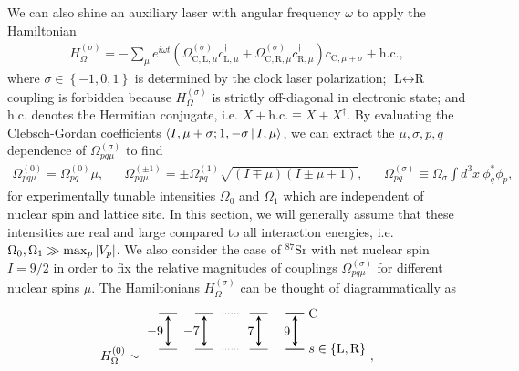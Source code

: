 \documentclass[aps,nofootinbib,notitlepage,11pt]{revtex4-1}
\renewcommand{\t}{\text} %
\newcommand{\p}[1]{\left(#1\right)} %
\renewcommand{\set}[1]{\left\{#1\right\}} %
\newcommand{\bk}{\Braket} %
\renewcommand{\L}{\text{L}}
\newcommand{\C}{\text{C}}
\newcommand{\R}{\text{R}}
\newcommand{\1}{\mathds{1}}
\begin{document}
We can also shine an auxiliary laser with angular frequency $\omega$
to apply the Hamiltonian
\begin{align}
  H_\Omega^{(\sigma)}
  = - \sum_\mu e^{i\omega t}
  \p{\Omega_{\C,\L,\mu}^{(\sigma)} c_{\L,\mu}^\dag
    + \Omega_{\C,\R,\mu}^{(\sigma)} c_{\R,\mu}^\dag} c_{\C,\mu+\sigma}
  + \t{h.c.},
\end{align}
where $\sigma\in\set{-1,0,1}$ is determined by the clock laser
polarization; $\L\leftrightarrow\R$ coupling is forbidden because
$H_\Omega^{(\sigma)}$ is strictly off-diagonal in electronic state;
and $\t{h.c.}$ denotes the Hermitian conjugate, i.e.
$X+\t{h.c.}\equiv X+X^\dag$.  By evaluating the Clebsch-Gordan
coefficients $\bk{I,\mu+\sigma;1,-\sigma|I,\mu}$, we can extract the
$\mu,\sigma,p,q$ dependence of $\Omega_{pq\mu}^{(\sigma)}$ to find
\begin{align}
  \Omega_{pq\mu}^{(0)} = \Omega_{pq}^{(0)} \mu,
  &&
  \Omega_{pq\mu}^{(\pm1)} = \pm \Omega_{pq}^{(1)}
  \sqrt{\p{I\mp\mu}\p{I\pm\mu+1}},
  &&
  \Omega_{pq}^{(\sigma)} \equiv \Omega_\sigma \int d^3x~ \phi_q^* \phi_p,
\end{align}
for experimentally tunable intensities $\Omega_0$ and $\Omega_1$ which
are independent of nuclear spin and lattice site.  In this section, we
will generally assume that these intensities are real and large
compared to all interaction energies,
i.e. $\Omega_0,\Omega_1\gg\max_p\abs{V_p}$.  We also consider the case
of ${}^{87}$Sr with net nuclear spin $I=9/2$ in order to fix the
relative magnitudes of couplings $\Omega_{pq\mu}^{(\sigma)}$ for
different nuclear spins $\mu$.  The Hamiltonians $H_\Omega^{(\sigma)}$
can be thought of diagrammatically as
\begin{align}
  H_\Omega^{(0)} \sim
  \begin{tikzpicture}[
    scale=0.5,
    trans/.style={thick,<->,shorten >=2pt,shorten <=2pt,>=stealth}
    ]
    \draw (0,0) -- (1,0);
    \draw (2,0) -- (3,0);
    \draw[dotted] (3.5,0) -- (4.5,0);
    \draw (5,0) -- (6,0);
    \draw (7,0) -- (8,0);
    \draw (7,0) -- (8,0) node[right] {$\C$};
    \draw (0,-2) -- (1,-2);
    \draw (2,-2) -- (3,-2);
    \draw[dotted] (3.5,-2) -- (4.5,-2);
    \draw (5,-2) -- (6,-2);
    \draw (7,-2) -- (8,-2);
    \draw (7,-2) -- (8,-2) node[right] {$s\in\set{\L,\R}$};
    \draw[trans] (0.5,0) -- (0.5,-2) node[midway,left] {$-9$};
    \draw[trans] (2.5,0) -- (2.5,-2) node[midway,left] {$-7$};
    \draw[trans] (5.5,0) -- (5.5,-2) node[midway,left] {$7$};
    \draw[trans] (7.5,0) -- (7.5,-2) node[midway,left] {$9$};
  \end{tikzpicture},
\end{align}
\end{document}
